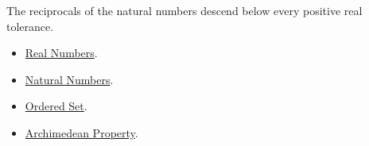 \begin{remark*}[Interpretation]
The reciprocals of the natural numbers descend below every positive real
tolerance.
\end{remark*}

\begin{dependencies}
\begin{itemize}
\item \hyperref[def:reals]{Real Numbers}.
\item \hyperref[def:natural-numbers]{Natural Numbers}.
\item \hyperref[def:ordered-set]{Ordered Set}.
\item \hyperref[thm:archimedean-property]{Archimedean Property}.
\end{itemize}
\end{dependencies}



